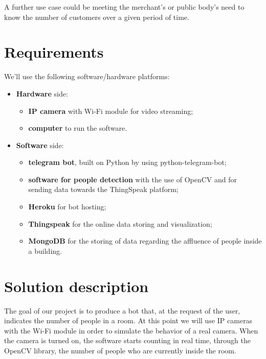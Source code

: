 A further use case could be meeting the merchant's or public body's need to know the number of customers over a given period of time.


\section{Requirements}
We'll use the following software/hardware platforms:
\begin{itemize}
    \item \textbf{Hardware} side:
    \begin{itemize}
        \item \textbf{IP camera} with Wi-Fi module for video streaming;%
        \item \textbf{computer} to run the software.%
    \end{itemize}
    \item \textbf{Software} side:
    \begin{itemize}
        \item \textbf{telegram bot}, built on Python by using python-telegram-bot;
        \item \textbf{software for people detection} with the use of OpenCV and for sending data towards the ThingSpeak platform;%
        \item \textbf{Heroku} for bot hosting;%
        \item \textbf{Thingspeak} for the online data storing and visualization;%
        \item \textbf{MongoDB} for the storing of data regarding the affluence of people inside a building.%
    \end{itemize}
\end{itemize}

\section{Solution description}
The goal of our project is to produce a bot that, at the request of the user, indicates the number of people in a room. At this point we will use IP cameras with the Wi-Fi module in order to simulate the behavior of a real camera. When the camera is turned on, the software starts counting in real time, through the OpenCV library, the number of people who are currently inside the room.

